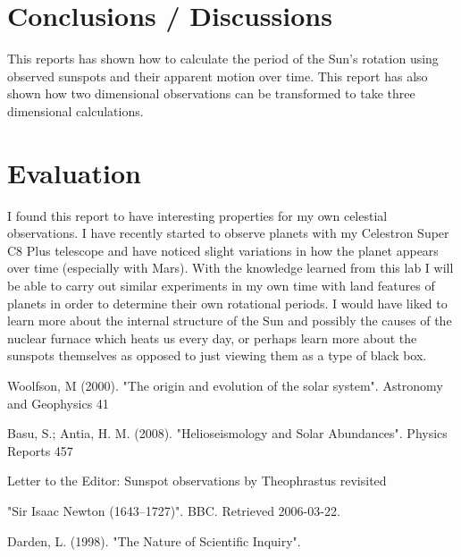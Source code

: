 \documentclass{article}
\begin{document}

\section{Conclusions / Discussions}

This reports has shown how to calculate the period of the Sun's rotation using observed sunspots and their
apparent motion over time. This report has also shown how two dimensional observations can be
transformed to take three dimensional calculations.


\section{Evaluation}

I found this report to have interesting properties for my own celestial observations. I have recently started to
observe planets with my Celestron Super C8 Plus telescope and have noticed slight variations in how the planet
appears over time (especially with Mars). With the knowledge learned from this lab I will be able to carry out
similar experiments in my own time with land features of planets in order to determine their own rotational periods.
I would have liked to learn more about the internal structure of the Sun and possibly the causes of the nuclear furnace
which heats us every day, or perhaps learn more about the sunspots themselves as opposed to just viewing them
as a type of black box.



\begin{thebibliography}{9}

Woolfson, M (2000). "The origin and evolution of the solar system". Astronomy and Geophysics 41

Basu, S.; Antia, H. M. (2008). "Helioseismology and Solar Abundances". Physics Reports 457

Letter to the Editor: Sunspot observations by Theophrastus revisited

 "Sir Isaac Newton (1643–1727)". BBC. Retrieved 2006-03-22.

 Darden, L. (1998). "The Nature of Scientific Inquiry".

\end{thebibliography}
\end{document}
